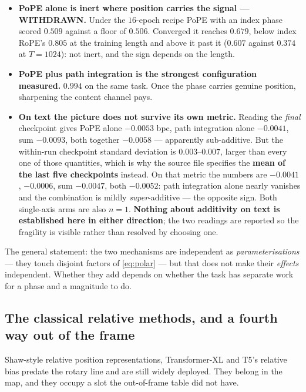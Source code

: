 \documentclass[11pt]{article}
\begin{document}
\begin{itemize}
\item \textbf{PoPE alone is inert where position carries the signal ---
  WITHDRAWN.} Under the $16$-epoch recipe PoPE with an index phase scored $0.509$
  against a floor of $0.506$. Converged it reaches $0.679$, below index RoPE's
  $0.805$ at the training length and above it past it ($0.607$ against $0.374$ at
  $T=1024$): not inert, and the sign depends on the length.
\item \textbf{PoPE plus path integration is the strongest configuration measured.}
  $0.994$ on the same task. Once the phase carries genuine position, sharpening the
  content channel pays.
\item \textbf{On text the picture does not survive its own metric.} Reading the
  \emph{final} checkpoint gives PoPE alone $-0.0053$ bpc, path integration alone
  $-0.0041$, sum $-0.0093$, both together $-0.0058$ --- apparently sub-additive.
  But the within-run checkpoint standard deviation is $0.003$--$0.007$, larger than
  every one of those quantities, which is why the source file specifies the
  \textbf{mean of the last five checkpoints} instead. On that metric the numbers
  are $-0.0041$, $-0.0006$, sum $-0.0047$, both $-0.0052$: path integration alone
  nearly vanishes and the combination is mildly \emph{super}-additive --- the
  opposite sign. Both single-axis arms are also $n=1$. \textbf{Nothing about
  additivity on text is established here in either direction}; the two readings are
  reported so the fragility is visible rather than resolved by choosing one.
\end{itemize}

\noindent The general statement: the two mechanisms are independent as
\emph{parameterisations} --- they touch disjoint factors of \eqref{eq:polar} ---
but that does not make their \emph{effects} independent. Whether they add depends
on whether the task has separate work for a phase and a magnitude to do.

\subsection{The classical relative methods, and a fourth way out of the frame}
\label{sec:classical}

Shaw-style relative position representations, Transformer-XL and T5's relative bias
predate the rotary line and are still widely deployed. They belong in the map, and
they occupy a slot the out-of-frame table did not have.
\end{document}
